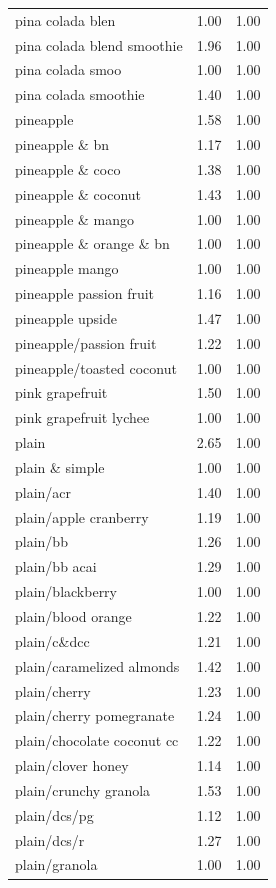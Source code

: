 \begin{table}
\begin{tabular}{lrr}
pina colada blen & 1.00 & 1.00 \\
pina colada blend smoothie & 1.96 & 1.00 \\
pina colada smoo & 1.00 & 1.00 \\
pina colada smoothie & 1.40 & 1.00 \\
pineapple & 1.58 & 1.00 \\
pineapple \& bn & 1.17 & 1.00 \\
pineapple \& coco & 1.38 & 1.00 \\
pineapple \& coconut & 1.43 & 1.00 \\
pineapple \& mango & 1.00 & 1.00 \\
pineapple \& orange \& bn & 1.00 & 1.00 \\
pineapple mango & 1.00 & 1.00 \\
pineapple passion fruit & 1.16 & 1.00 \\
pineapple upside & 1.47 & 1.00 \\
pineapple/passion fruit & 1.22 & 1.00 \\
pineapple/toasted coconut & 1.00 & 1.00 \\
pink grapefruit & 1.50 & 1.00 \\
pink grapefruit lychee & 1.00 & 1.00 \\
plain & 2.65 & 1.00 \\
plain \& simple & 1.00 & 1.00 \\
plain/acr & 1.40 & 1.00 \\
plain/apple cranberry & 1.19 & 1.00 \\
plain/bb & 1.26 & 1.00 \\
plain/bb acai & 1.29 & 1.00 \\
plain/blackberry & 1.00 & 1.00 \\
plain/blood orange & 1.22 & 1.00 \\
plain/c\&dcc & 1.21 & 1.00 \\
plain/caramelized almonds & 1.42 & 1.00 \\
plain/cherry & 1.23 & 1.00 \\
plain/cherry pomegranate & 1.24 & 1.00 \\
plain/chocolate coconut cc & 1.22 & 1.00 \\
plain/clover honey & 1.14 & 1.00 \\
plain/crunchy granola & 1.53 & 1.00 \\
plain/dcs/pg & 1.12 & 1.00 \\
plain/dcs/r & 1.27 & 1.00 \\
plain/granola & 1.00 & 1.00 \\

\end{tabular}
\end{table}
